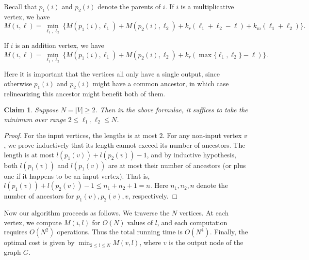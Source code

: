 \documentclass[11pt]{article} %
\theoremstyle{plain}
\newtheorem{claim}{Claim}
\theoremstyle{definition}
\begin{document}


Recall that $p_1(i)$ and $p_2(i)$ denote the parents of $i$. If $i$ is a multiplicative vertex, we have 
$$M(i,\ell)=\min_{\ell_1,\ell_2}\{M(p_1(i),\ell_1)+M(p_2(i),\ell_2)+k_r(\ell_1+\ell_2-\ell)+k_m(\ell_1+\ell_2)\}.$$

If $i$ is an addition vertex, we have 
$$M(i,\ell)=\min_{\ell_1,\ell_2}\{M(p_1(i),\ell_1)+M(p_2(i),\ell_2)+k_r(\max\{\ell_1,\ell_2\}-\ell)\}.$$

Here it is important that the vertices all only have a single output, since otherwise $p_1(i)$ and $p_2(i)$ might have a common ancestor, in which case relinearizing this ancestor might benefit both of them.

\begin{claim} Suppose $N  = |V| \ge 2$. Then in the above formulae, it suffices to take the minimum over range $2\le \ell_1, \ell_2 \le N$.
\end{claim}

\begin{proof}
For the input vertices, the lengths is at most $2$. For any non-input vertex $v$, we prove inductively that its length cannot exceed its number of  ancestors. The length is at most $l(p_1(v)) + l(p_2(v))-1$, and by inductive hypothesis, both $l(p_1(v))$ and $l(p_1(v))$ are at most their number of ancestors (or plus one if it happens to be an input vertex). That is, $l(p_1(v)) + l(p_2(v))-1 \le n_1+n_2+1=n$. Here $n_1, n_2, n$ denote the number of ancestors for $p_1(v), p_2(v), v$, respectively. 
\end{proof}

Now our algorithm proceeds as follows. We traverse the $N$ vertices. At each vertex, we compute $M(i,l)$ for $O(N)$ values of $l$, and each computation requires $O(N^2)$ operations. Thus the total running time is $O(N^4)$. Finally, the optimal cost is given by 
$\min_{2 \leq l \leq N} M(v, l)$, where $v$ is the output node of the graph $G$. 
\end{document}
